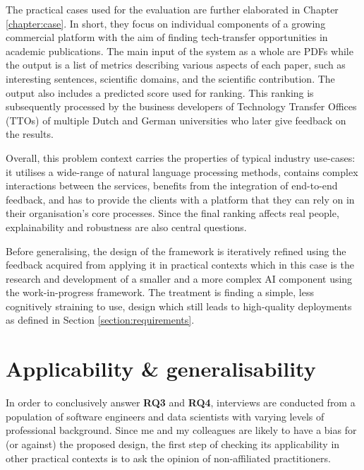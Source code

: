 The practical cases used for the evaluation are further elaborated in Chapter \ref{chapter:case}. In short, they focus on individual components of a growing commercial platform with the aim of finding tech-transfer opportunities in academic publications. The main input of the system as a whole are PDFs while the output is a list of metrics describing various aspects of each paper, such as interesting sentences, scientific domains, and the scientific contribution. The output also includes a predicted score used for ranking. This ranking is subsequently processed by the business developers of Technology Transfer Offices (TTOs) of multiple Dutch and German universities who later give feedback on the results.

Overall, this problem context carries the properties of typical industry use-cases: it utilises a wide-range of natural language processing methods, contains complex interactions between the services, benefits from the integration of end-to-end feedback, and has to provide the clients with a platform that they can rely on in their organisation's core processes. Since the final ranking affects real people, explainability and robustness are also central questions.

Before generalising, the design of the framework is iteratively refined using the feedback acquired from applying it in practical contexts which in this case is the research and development of a smaller and a more complex AI component using the work-in-progress framework. The treatment is finding a simple, less cognitively straining to use, design which still leads to high-quality deployments as defined in Section \ref{section:requirements}.

\section{Applicability \& generalisability} \label{section:interview-setup}

In order to conclusively answer \textbf{RQ3} and \textbf{RQ4}, interviews are conducted from a population of software engineers and data scientists with varying levels of professional background. Since me and my colleagues are likely to have a bias for (or against) the proposed design, the first step of checking its applicability in other practical contexts is to ask the opinion of non-affiliated practitioners.

